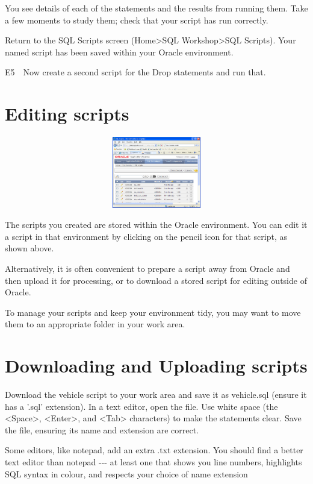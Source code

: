 You see details of each of the statements and the results from running them.  Take a few moments to study them; check that your script has run correctly.

Return to the SQL Scripts screen (Home{\textgreater}SQL Workshop{\textgreater}SQL Scripts).  Your named script has been saved within your Oracle environment.

E5\ \ Now create a second script for the Drop statements and run that.

\clearpage
\section{Editing scripts}

\includegraphics[width=14.9cm,height=3.108cm]{images/img (45).png}
 

The scripts you created are stored within the Oracle environment.  You can edit it a script in that environment by clicking on the pencil icon for that script, as shown above.

Alternatively, it is often convenient to prepare a script away from Oracle and then upload it for processing, or to download a stored script for editing outside of Oracle.

To manage your scripts and keep your environment tidy, you may want to move them to an appropriate folder in your work area.

\section{Downloading and Uploading scripts}
Download the vehicle script to your work area and save it as vehicle.sql (ensure it has a '.sql' extension). In a text editor, open the file. Use white space (the {\textless}Space{\textgreater}, {\textless}Enter{\textgreater}, and {\textless}Tab{\textgreater} characters) to make the statements clear. Save the file, ensuring its name and extension are correct.

Some editors, like notepad, add an extra .txt extension. You should find a better text editor than notepad -{}-{}- at least one that shows you line numbers, highlights SQL syntax in colour, and respects your choice of name extension

